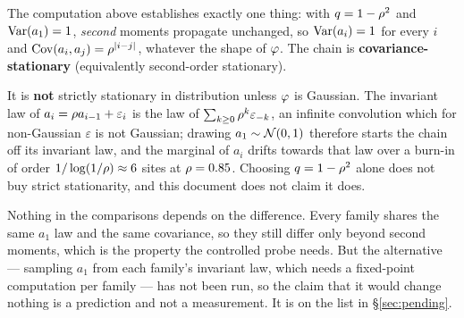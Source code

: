 \begin{remark}
\label{rem:cov-stationary}
The computation above establishes exactly one thing: with $q=1-\rho^2$ and
$\operatorname{Var}(a_1)=1$, \emph{second} moments propagate unchanged, so $\operatorname{Var}(a_i)=1$ for every $i$ and
$\operatorname{Cov}(a_i,a_j)=\rho^{|i-j|}$, whatever the shape of $\varphi$. The chain is
\textbf{covariance-stationary} (equivalently second-order stationary).

It is \textbf{not} strictly stationary in distribution unless $\varphi$ is Gaussian. The
invariant law of $a_i = \rho a_{i-1} + \varepsilon_i$ is the law of
$\sum_{k\ge0}\rho^k\varepsilon_{-k}$, an infinite convolution which for non-Gaussian
$\varepsilon$ is not Gaussian; drawing $a_1\sim\mathcal{N}\!\left(0,1\right)$ therefore starts the chain off
its invariant law, and the marginal of $a_i$ drifts towards that law over a burn-in of order
$1/\log(1/\rho)\approx6$ sites at $\rho=0.85$. Choosing $q=1-\rho^2$ alone does not
buy strict stationarity, and this document does not claim it does.

Nothing in the comparisons depends on the difference. Every family shares the same $a_1$ law
and the same covariance, so they still differ only beyond second moments, which is the property
the controlled probe needs. But the alternative --- sampling $a_1$ from each family's invariant
law, which needs a fixed-point computation per family --- has not been run, so the claim that it
would change nothing is a prediction and not a measurement. It is on the list in
\S\ref{sec:pending}.
\end{remark}
